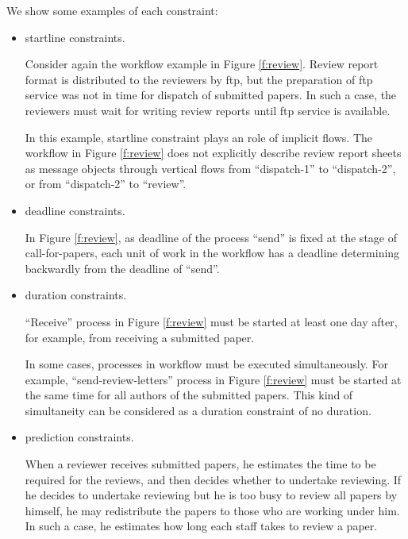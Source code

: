 We show some examples of each constraint:
\begin{itemize}
 \item startline constraints.

       Consider again the workflow example in Figure \ref{f:review}.
       Review report format is distributed to
       the reviewers by ftp, but the preparation of ftp service was not
       in time for dispatch of submitted papers.  In such a case, the
       reviewers must wait for writing review reports until ftp service
       is available.

       \begin{sloppypar}
	In this example, startline constraint plays an role of implicit
       	flows.  The workflow in Figure \ref{f:review} does not explicitly
       	describe review report sheets as message objects through vertical
       	flows from ``dispatch-1'' to ``dispatch-2'', or from
       ``dispatch-2'' to ``review''.
       \end{sloppypar}
 \item deadline constraints.

       In Figure \ref{f:review}, as deadline of the process ``send'' is
       fixed at the stage of call-for-papers, each unit of work in the
       workflow has a deadline determining backwardly from the deadline
       of ``send''.
 \item duration constraints.

       ``Receive'' process in Figure \ref{f:review} must be started at
       least one day after, for example, from receiving a submitted
       paper.

       In some cases, processes in workflow must be executed
       simultaneously.  For example, ``send-review-letters'' process in
       Figure \ref{f:review} must be started at the same time for all
       authors of the submitted papers.  This kind of simultaneity can
       be considered as a duration constraint of no duration.
 \item prediction constraints.

       When a reviewer receives submitted papers, he estimates the time
       to be required for the reviews, and then decides whether to
       undertake reviewing.  If he decides to undertake reviewing but he
       is too busy to review all papers by himself, he may redistribute
       the papers to those who are working under him.  In such a case,
       he estimates how long each staff takes to review a paper.
\end{itemize}

